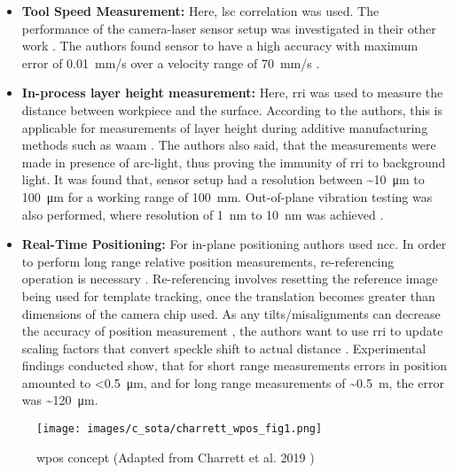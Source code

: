         \begin{itemize}

            \item \textbf{Tool Speed Measurement:} Here, \gls{lsc} correlation was used. The performance of the camera-laser sensor setup was investigated in their other work \cite{charrett_2018}. The authors found sensor to have a high accuracy with maximum error of \pm\SI{0.01}{\milli\meter/\second} over a velocity range of \pm\SI{70}{\milli\meter/\second} \cite{charrett_wpos}.
            
            \item \textbf{In-process layer height measurement:} Here, \gls{rri} was used to measure the distance between workpiece and the surface. According to the authors, this is applicable for measurements of layer height during additive manufacturing methods such as \gls{waam} \cite{hallam_waam}. The authors also said, that the measurements were made in presence of arc-light, thus proving the immunity of \gls{rri} to background light. It was found that, sensor setup had a resolution between \sim \SI{10}{\micro\meter} to \SI{100}{\micro\meter} for a working range of \SI{100}{\milli\meter}. Out-of-plane vibration testing was also performed, where resolution of \SI{1}{\nano\meter} to \SI{10}{\nano\meter} was achieved \cite{charrett_wpos}. 

            \item \textbf{Real-Time Positioning:} For in-plane positioning authors used \gls{ncc}. In order to perform long range relative position measurements, re-referencing operation is necessary \cite{charrett_wpos}. Re-referencing involves resetting the reference image being used for template tracking, once the translation becomes greater than dimensions of the camera chip used. As any tilts/misalignments can decrease the accuracy of position measurement \cite{charrett_2018}, the authors want to use \gls{rri} to update scaling factors that convert speckle shift to actual distance \cite{charrett_wpos}. Experimental findings conducted show, that for short range measurements errors in position amounted to \textless\SI{0.5}{\micro\meter}, and for long range measurements of \sim \SI{0.5}{\meter}, the error was \sim\SI{120}{\micro\meter}.

        \end{itemize}
            
        \begin{figure}
            \centering
            \texttt{[image: images/c\_sota/charrett\_wpos\_fig1.png]}
            \caption{\gls{wpos} concept (Adapted from Charrett et al. 2019 \cite{charrett_wpos})}
            \label{fig:charrett_wpos_fig1.png}
        \end{figure}
        
